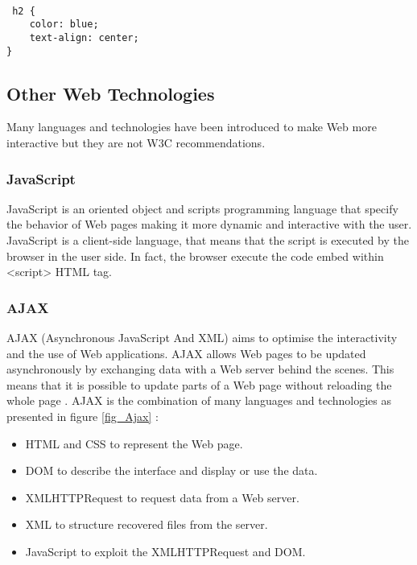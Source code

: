 {\tt \small
\centering
\begin{verbatim}
 h2 {
    color: blue;
    text-align: center;
}
\end{verbatim}
}




\subsection{Other Web Technologies}

Many languages and technologies have been introduced to make Web more interactive but they are not W3C recommendations.

\subsubsection{JavaScript}

JavaScript is an oriented object and scripts programming language that specify the behavior of Web pages making it more dynamic and interactive with the user.\\
JavaScript is a client-side language, that means that the script is executed by the browser in the user side. In fact, the browser execute the code embed within <script> HTML tag.


\subsubsection{AJAX}

AJAX (Asynchronous JavaScript And XML) aims to optimise the interactivity and the use of Web applications. AJAX allows Web pages to be updated asynchronously by exchanging data with a Web server behind the scenes. This means that it is possible to update parts of a Web page without reloading the whole page \cite{ajax}.
AJAX is the combination of many languages and technologies as presented in figure \ref{fig_Ajax} :
\begin{itemize}
    \item HTML and CSS to represent the Web page.
     \item DOM to describe the interface and display or use the data.
     \item XMLHTTPRequest to request data from a Web server.
     \item XML to structure recovered files from the server.
     \item JavaScript to exploit the XMLHTTPRequest and DOM.
\end{itemize} 

